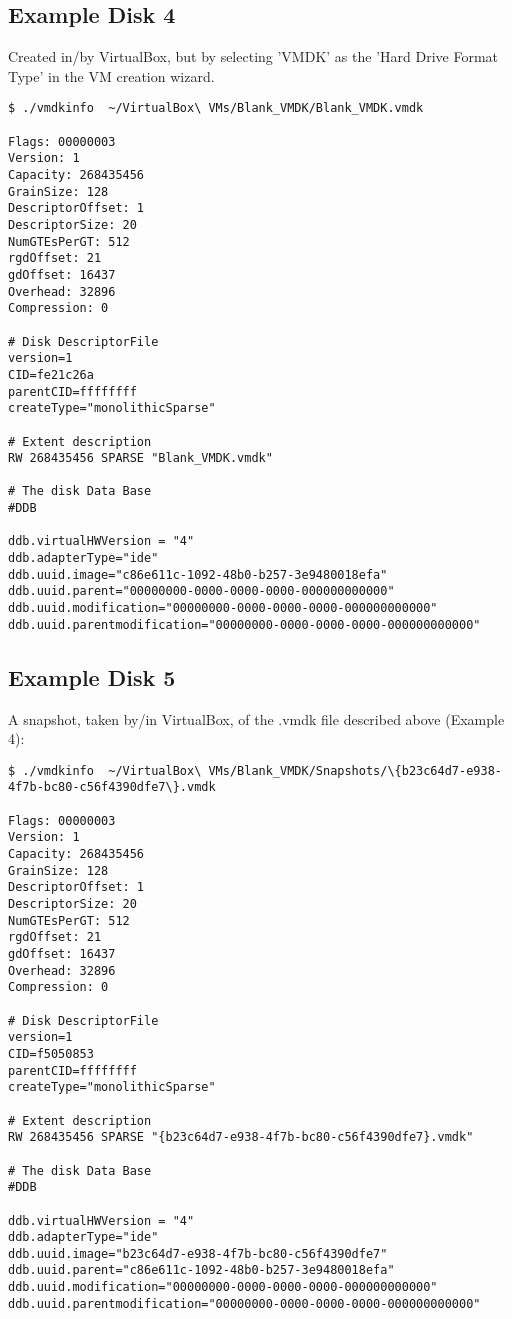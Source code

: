 \documentclass{article}
\begin{document}
\subsection{Example Disk 4}

Created in/by VirtualBox, but by selecting 'VMDK' as the 'Hard Drive
Format Type' in the VM creation wizard.

\begin{verbatim}
$ ./vmdkinfo  ~/VirtualBox\ VMs/Blank_VMDK/Blank_VMDK.vmdk 

Flags: 00000003
Version: 1
Capacity: 268435456
GrainSize: 128
DescriptorOffset: 1
DescriptorSize: 20
NumGTEsPerGT: 512
rgdOffset: 21
gdOffset: 16437
Overhead: 32896
Compression: 0

# Disk DescriptorFile
version=1
CID=fe21c26a
parentCID=ffffffff
createType="monolithicSparse"

# Extent description
RW 268435456 SPARSE "Blank_VMDK.vmdk"

# The disk Data Base 
#DDB

ddb.virtualHWVersion = "4"
ddb.adapterType="ide"
ddb.uuid.image="c86e611c-1092-48b0-b257-3e9480018efa"
ddb.uuid.parent="00000000-0000-0000-0000-000000000000"
ddb.uuid.modification="00000000-0000-0000-0000-000000000000"
ddb.uuid.parentmodification="00000000-0000-0000-0000-000000000000"
\end{verbatim}

\subsection{Example Disk 5}

A snapshot, taken by/in VirtualBox, of the .vmdk file described above
(Example 4):

\begin{verbatim}
$ ./vmdkinfo  ~/VirtualBox\ VMs/Blank_VMDK/Snapshots/\{b23c64d7-e938-4f7b-bc80-c56f4390dfe7\}.vmdk 

Flags: 00000003
Version: 1
Capacity: 268435456
GrainSize: 128
DescriptorOffset: 1
DescriptorSize: 20
NumGTEsPerGT: 512
rgdOffset: 21
gdOffset: 16437
Overhead: 32896
Compression: 0

# Disk DescriptorFile
version=1
CID=f5050853
parentCID=ffffffff
createType="monolithicSparse"

# Extent description
RW 268435456 SPARSE "{b23c64d7-e938-4f7b-bc80-c56f4390dfe7}.vmdk"

# The disk Data Base 
#DDB

ddb.virtualHWVersion = "4"
ddb.adapterType="ide"
ddb.uuid.image="b23c64d7-e938-4f7b-bc80-c56f4390dfe7"
ddb.uuid.parent="c86e611c-1092-48b0-b257-3e9480018efa"
ddb.uuid.modification="00000000-0000-0000-0000-000000000000"
ddb.uuid.parentmodification="00000000-0000-0000-0000-000000000000"
\end{verbatim}
\end{document}
